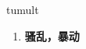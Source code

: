 
\begin{frame}
{\huge tumult}
\begin{center}
\begin{enumerate}\Large
  \item \textbf{骚乱，暴动}
\end{enumerate}
\end{center}
\end{frame}
